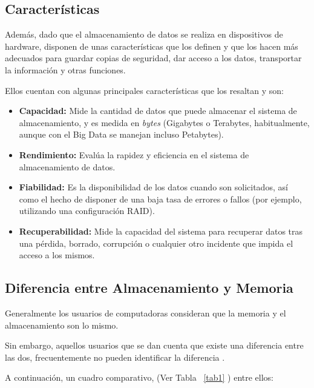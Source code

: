 \documentclass[10pt,journal]{IEEEtran}
\begin{document}
    \subsection{\textbf{Características}}
    Además, dado que el almacenamiento de datos se realiza en dispositivos de hardware, disponen de unas características que los definen y que los hacen más adecuados para guardar copias de seguridad, dar acceso a los datos, transportar la información y otras funciones.
    
    Ellos cuentan con algunas principales características que los resaltan y son: 
    
    \begin{itemize}
        \item \textbf{Capacidad: }Mide la cantidad de datos que puede almacenar el sistema de almacenamiento, y es medida en \textit{bytes} (Gigabytes o Terabytes, habitualmente, aunque con el Big Data se manejan incluso Petabytes). 
    
        \item \textbf{Rendimiento: }Evalúa la rapidez y eficiencia en el sistema de almacenamiento de datos. 
        
        \item \textbf{Fiabilidad: }Es la disponibilidad de los datos cuando son solicitados, así como el hecho de disponer de una baja tasa de errores o fallos (por ejemplo, utilizando una configuración RAID). 
    
        \item \textbf{Recuperabilidad: }Mide la capacidad del sistema para recuperar datos tras una pérdida, borrado, corrupción o cualquier otro incidente que impida el acceso a los mismos.
    \end{itemize}
    
    \subsection{\textbf{Diferencia entre Almacenamiento y Memoria}}
    Generalmente los usuarios de computadoras consideran que la memoria y el almacenamiento son lo mismo.
    
    Sin embargo, aquellos usuarios que se dan cuenta que existe una diferencia entre las dos, frecuentemente no pueden identificar la diferencia \citep{Ladifere16:online}.
    
    A continuación, un cuadro comparativo, (Ver Tabla ~\ref{tab1} ) entre ellos:
\end{document}
